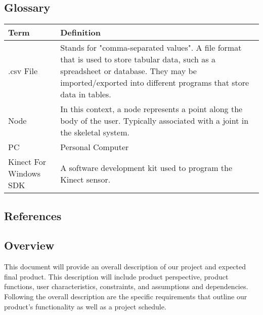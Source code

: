 \documentclass[onecolumn, draftclsnofoot,10pt, compsoc]{IEEEtran}
\begin{document}
\subsection{Glossary}
        \begin{tabu} to 
        \hline
        \textbf{Term} & \textbf{Definition}\\
        \hline
        .csv File & Stands for "comma-separated values". A file format that is used to store tabular data, such as a spreadsheet or database. They may be imported/exported into different programs that store data in tables\cite{csvFile}.\\
        \hline
        Node & In this context, a node represents a point along the body of the user. Typically associated with a joint in the skeletal system\cite{KinectDevelop}.\\
        \hline
        PC & Personal Computer\\
        \hline
        Kinect For Windows SDK & A software development kit used to program the Kinect sensor\cite{KinectDevelop}.\\
        \hline
\end{tabu}
\subsection{References}



\newpage
\subsection{Overview}
This document will provide an overall description of our project and expected final 
product. This description will include product perspective, product functions, user 
characteristics, constraints, and assumptions and dependencies. Following the overall 
description are the specific requirements that outline our product's functionality as 
well as a project schedule.
\end{document}
